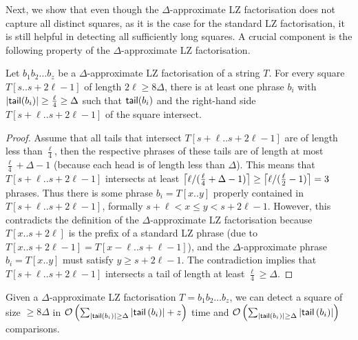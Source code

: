 Next, we show that even though the $\Delta$-approximate LZ factorisation does not capture all distinct squares, as it is the case for the standard LZ factorisation, it is still helpful in detecting all sufficiently long squares.
A crucial component is the following property of the $\Delta$-approximate LZ factorisation.

\begin{lemma}
\label{lem:longhelper}
Let $b_{1}b_{2}\ldots b_{z}$ be a $\Delta$-approximate LZ factorisation of a string $T$. For every square $T[s..s+2\ell - 1]$ of length $2\ell \geq 8\Delta$, there is at least one phrase $b_i$ with $\left\lvert\textsf{tail}(b_i)\right\rvert \geq \frac \ell 4 \geq \Delta$ such that $\textsf{tail}(b_i)$ and the right-hand side $T[s + \ell..s+2\ell - 1]$ of the square intersect.
\end{lemma}
\begin{proof}
Assume that all tails that intersect $T[s + \ell..s+2\ell - 1]$ are of length less than $\frac \ell 4$, then the respective phrases of these tails are of length at most $\frac \ell 4 + \Delta - 1$ (because each head is of length less than $\Delta$). 
This means that $T[s + \ell..s+2\ell - 1]$ intersects at least $\left\lceil\ell / (\frac \ell 4 + \Delta - 1)\right\rceil \geq \left\lceil\ell / (\frac \ell 2 - 1)\right\rceil = 3$ phrases.
Thus there is some phrase $b_i = T[x..y]$ properly contained in $T[s+\ell..s+2\ell-1]$, formally $s+\ell < x \leq y < s + 2\ell - 1$.
However, this contradicts the definition of the $\Delta$-approximate LZ factorisation because $T[x..s+2\ell]$ is the prefix of a standard LZ phrase (due to $T[x..s+2\ell - 1] = T[x - \ell..s+\ell - 1]$), and the $\Delta$-approximate phrase $b_i = T[x..y]$ must satisfy $y \geq s + 2\ell - 1$.
The contradiction implies that $T[s+\ell..s+2\ell - 1]$ intersects a tail of length at least $\frac \ell 4 \geq \Delta$.
\end{proof}


\begin{lemma}
\label{lem:long}
Given a $\Delta$-approximate LZ factorisation $T = b_{1}b_{2}\ldots b_{z}$,
we can detect a square of size $\geq8\Delta$ in $\mathcal{O}\left(\sum_{\left\lvert\textsf{tail}\left(b_{i}\right)\right\rvert \geq \Delta}\left\lvert\textsf{tail}\left(b_{i}\right)\right\rvert + z\right)$ time and $\mathcal{O}\left(\sum_{\left\lvert\textsf{tail}\left(b_{i}\right)\right\rvert \geq \Delta}\left\lvert\textsf{tail}\left(b_{i}\right)\right\rvert\right)$ comparisons.
\end{lemma}

